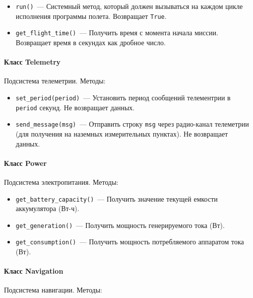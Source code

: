 \documentclass[12pt,a4paper]{article}
\begin{document}
\begin{itemize}
\item \verb'run()'~--- Системный метод, который должен вызываться на каждом цикле
  исполнения программы полета. Возвращает \verb'True'.
\item \verb'get_flight_time()'~--- Получить время с момента начала миссии. Возвращает
  время в секундах как дробное число.
\end{itemize}
  
\paragraph{Класс Telemetry}

Подсистема телеметрии. Методы:

\begin{itemize}
\item \verb'set_period(period)'~--- Установить период сообщений телементрии
  в \verb'period' секунд. Не возвращает данных.
\item \verb'send_message(msg)'~--- Отправить строку \verb'msg' через радио-канал
  телеметрии (для получения на наземных измерительных пунктах). Не возвращает данных.
\end{itemize}

\paragraph{Класс Power}

Подсистема электропитания. Методы:

\begin{itemize}
\item \verb'get_battery_capacity()'~--- Получить значение текущей емкости аккумулятора (Вт-ч).
\item \verb'get_generation()'~--- Получить мощность генерируемого тока (Вт).
\item \verb'get_consumption()'~--- Получить мощность потребляемого аппаратом тока (Вт).
\end{itemize}

\paragraph{Класс Navigation}

Подсистема навигации. Методы:
\end{document}
